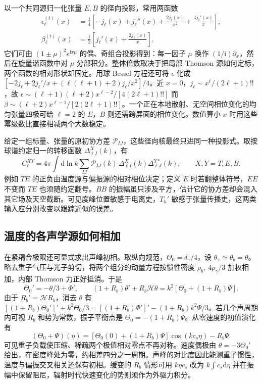 以一个共同源归一化张量 $E,B$ 的径向投影，常用两函数
\begin{align*}
 \epsilon_\ell^{(t)}(x)&=\frac14
 \left[-j_\ell(x)+j_\ell''(x)+\frac{2j_\ell(x)}{x^2}
                         +\frac{4j_\ell'(x)}{x}\right],\\
 \beta_\ell^{(t)}(x)&=\frac12
 \left[j_\ell'(x)+\frac{2j_\ell(x)}{x}\right].
\end{align*}
它们可由 $(1\pm\mu)^2e^{\mathrm ix\mu}$ 的偶、奇组合投影得到：每一因子 $\mu$ 换作 $(1/\mathrm i)\partial_x$，然后在旋量谐函数中对 $\mu$ 分部积分。整体倍数取决于把局部 Thomson 源如何定标，两个函数的相对形状却固定。用球 Bessel 方程还可将 $\epsilon$ 化成 $[-2j_\ell+2j_\ell'/x+(\ell(\ell+1)+2)j_\ell/x^2]/4$。近 $x=0$，$j_\ell\sim x^\ell/(2\ell+1)!!$，故 $\epsilon\sim(\ell+1)(\ell+2)x^{\ell-2}/[4(2\ell+1)!!]$ 而 $\beta\sim(\ell+2)x^{\ell-1}/[2(2\ell+1)!!]$。一个正在本地散射、无空间相位变化的均匀张量四极可给 $\ell=2$ 的 $E$，$B$ 则还需跨屏面的相位变化。数值算小 $x$ 时用这些幂级数比直接相减两个大数稳定。

给定一组标量、张量的原初协方差 $\mathcal P_{IJ}$，这些径向核最终只进同一种投影式。取按球谐约定归一的转移函数 $\Delta^X_{\ell I}(k)$，有
\[
 C_\ell^{XY}=4\pi\int \mathrm d\ln k\sum_{IJ}
 \mathcal P_{IJ}(k)\,\Delta^X_{\ell I}(k)\Delta^{Y*}_{\ell J}(k),
 \qquad X,Y=T,E,B.
\]
例如 $TE$ 的正负由温度源与偏振源的相对相位决定；定义 $E$ 时若翻整体符号，$EE$ 不变而 $TE$ 也须随约定翻号。$BB$ 的振幅虽只涉及平方，估计它的协方差却会混入其它场及天空截断。可见度峰位置敏感于电离史，$T_h'$ 敏感于张量传播史，这两类输入应分别改变以跟踪近似的误差。

\subsection{温度的各声学源如何相加}

在紧耦合极限还可显式求出声峰初相。取纵向规范，$\Theta_0=\delta_\gamma/4$，设 $\theta_\gamma\simeq\theta_b=\theta$。略去重子气压与光子剪切，将两个组分的动量方程按惯性密度 $\rho_b,\ 4\rho_\gamma/3$ 加权相加，内部 Thomson 力正好抵消。于是
\[
 \Theta_0'=-\theta/3+\Phi',\qquad
 (1+R_b)\theta'+R_b\mathcal H\theta
 =k^2[\Theta_0+(1+R_b)\Psi].
\]
由于 $R_b'=\mathcal H R_b$，消去 $\theta$ 有 $[(1+R_b)\Theta_0']'+k^2\Theta_0/3=[(1+R_b)\Phi']'-(1+R_b)k^2\Psi/3$。若几个声周期内可视 $R_b$ 和势为常数，振子平衡点是 $\Theta_0=-(1+R_b)\Psi$。从零速度的初值演化有
\[
 (\Theta_0+\Psi)(\eta)
 =[\Theta_0(0)+(1+R_b)\Psi]\cos(kc_s\eta)-R_b\Psi .
\]
可见重子负载使压缩、稀疏两个极值相对零点不再对称。速度偶极由 $\theta=-3\Theta_0'$ 给出，在密度峰处为零，约相差四分之一周期。声峰的对比度因此能测重子惯性，温度与偏振交叉相关还保有初相。缓变的 $R_b$ 情形可用 $k\eta c_s$ 改为 $k\int c_s\mathrm d\eta$ 并在振幅中保留阻尼，辐射时代快速变化的势则须作为外驱力积分。

